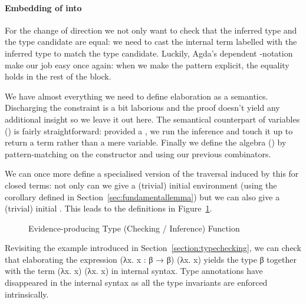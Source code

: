 \paragraph{Embedding of  into } For the change of direction
 we not only want to check that the inferred type and the type candidate
are equal: we need to cast the internal term labelled with the inferred type to
match the type candidate. Luckily, Agda's dependent -notation make our
job easy once again: when we make the pattern  explicit, the equality holds
in the rest of the block.
\begin{agdasnippet}
\end{agdasnippet}

We have almost everything we need to define elaboration as a semantics. Discharging
the  constraint is a bit laborious and the proof doesn't
yield any additional insight so we leave it out here. The semantical counterpart of
variables () is fairly straightforward: provided a , we run the
inference and touch it up to return a term rather than a mere variable. Finally we
define the algebra () by pattern-matching on the constructor and using our
previous combinators. 

We can once more define a specialised version of the traversal induced by this
 for closed terms: not only can we give a (trivial) initial
environment (using the  corollary defined in Section~\ref{sec:fundamentallemma})
but we can also give a (trivial) initial . This leads to the
definitions in Figure~\ref{fig:typedelaboration}.

\begin{figure}[h]
\begin{minipage}{0.45\textwidth}
\end{minipage}\hfill
\begin{minipage}{0.45\textwidth}
\end{minipage}
\caption{Evidence-producing Type (Checking / Inference) Function}
\label{fig:typedelaboration}
\end{figure}

Revisiting the example introduced in Section~\ref{section:typechecking},
we can check that elaborating the expression {(λx. x : β → β) (λx. x)}
yields the type {β} together with the term {(λx. x) (λx. x)} in internal
syntax. Type annotations have disappeared in the internal syntax as all
the type invariants are enforced intrinsically.

\begin{figure}[h]
\end{figure}
